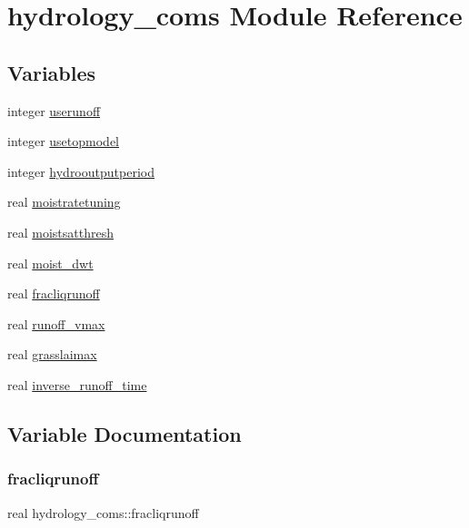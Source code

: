 \hypertarget{namespacehydrology__coms}{}\section{hydrology\+\_\+coms Module Reference}
\label{namespacehydrology__coms}
\subsection*{Variables}
\begin{DoxyCompactItemize}
\item 
integer \hyperlink{namespacehydrology__coms_a072b19b9aec29e8e63c2ad3786bbf6b5}{userunoff}
\item 
integer \hyperlink{namespacehydrology__coms_a20c98af9cfbbd7e0d75c0d2a421fbec7}{usetopmodel}
\item 
integer \hyperlink{namespacehydrology__coms_a348ebb6cbfa8e8217dca91c1e910a611}{hydrooutputperiod}
\item 
real \hyperlink{namespacehydrology__coms_a65f54a2e7ea5015b08a837fd9ffce040}{moistratetuning}
\item 
real \hyperlink{namespacehydrology__coms_a9d7e7e6a1aef383c309cba9b4670a677}{moistsatthresh}
\item 
real \hyperlink{namespacehydrology__coms_aa462c5cf44e4b6d6514539ea959dc840}{moist\+\_\+dwt}
\item 
real \hyperlink{namespacehydrology__coms_a4b086e4a697e284b38cf48df23d29c65}{fracliqrunoff}
\item 
real \hyperlink{namespacehydrology__coms_aa205de3a162ef0ad0200c32e36714a60}{runoff\+\_\+vmax}
\item 
real \hyperlink{namespacehydrology__coms_ab41659cd5c15da7c08da30a343a71d89}{grasslaimax}
\item 
real \hyperlink{namespacehydrology__coms_a1bb2a2286d85f992ccf8dd104ba036a3}{inverse\+\_\+runoff\+\_\+time}
\end{DoxyCompactItemize}


\subsection{Variable Documentation}
\mbox{\label{namespacehydrology__coms_a4b086e4a697e284b38cf48df23d29c65}} 
\subsubsection{\texorpdfstring{fracliqrunoff}{fracliqrunoff}}
{\footnotesize\ttfamily real hydrology\+\_\+coms\+::fracliqrunoff}

